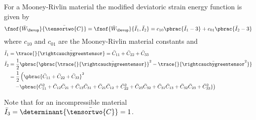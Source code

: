 For a Mooney-Rivlin material the modified deviatoric strain energy function is given by
\begin{equation}
  \fnof{\bar{W}_{\Devop}}{\bar{\tensortwo{C}}}=\fnof{\bar{W}_{\Devop}}{\bar{I}_{1},\bar{I}_{2}}=c_{10}\pbrac{\bar{I}_{1}-3}+c_{01}\pbrac{\bar{I}_{2}-3}
\end{equation}
where $c_{10}$ and $c_{01}$ are the Mooney-Rivlin material constants and
\begin{equation}
  \begin{split}
    \bar{I}_{1}&=\trace{}{\bar{\rightcauchygreentensor}}=\bar{C}_{11}+\bar{C}_{22}+\bar{C}_{33}\\
    \bar{I}_{2}&=\frac{1}{2}\pbrac{\pbrac{\trace{}{\bar{\rightcauchygreentensor}}}^{2}-\trace{}{\bar{\rightcauchygreentensor}^{2}}}
    \\ &=\dfrac{1}{2}\left(\pbrac{\bar{C}_{11}+\bar{C}_{22}+\bar{C}_{33}}^{2}\right. \\ &
    \quad\left.-\pbrac{\bar{C}_{11}^{2}+\bar{C}_{12}\bar{C}_{21}+\bar{C}_{13}\bar{C}_{31}+
      \bar{C}_{21}\bar{C}_{12}+\bar{C}_{22}^{2}+\bar{C}_{23}\bar{C}_{32}+\bar{C}_{31}\bar{C}_{13}+\bar{C}_{32}\bar{C}_{23}+\bar{C}_{33}^{2}}\right)
  \end{split}
\end{equation}

Note that for an incompressible material $\bar{I}_{3}=\determinant{\bar{\tensortwo{C}}}=1$.

